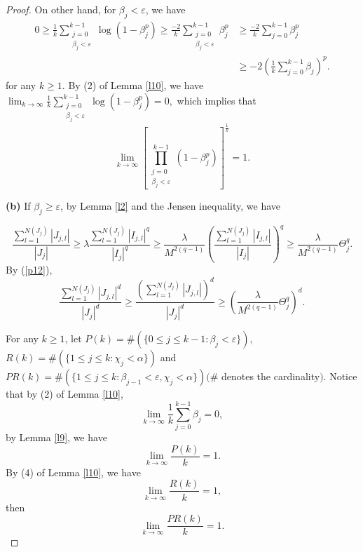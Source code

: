 \documentclass[reqno]{amsart}
\theoremstyle{plain}
\theoremstyle{definition}
\theoremstyle{remark}
\numberwithin{equation}{section} \DeclareMathOperator\intr{int}
\begin{document}
\begin{proof}
On other hand, for $\beta_j<\varepsilon$, we have
\begin{equation*}
\begin{aligned}
0\ge \frac{1}{k} \sum_{\substack{j = 0\\\beta_j<\varepsilon }}^{k-1}\log(1-\beta^p_j)\ge\frac{-2}{k} \sum_{\substack{j = 0\\\beta_j<\varepsilon }}^{k-1}\beta^p_j&\ge\frac{-2}{k}\sum_{j = 0}^{k-1}\beta^p_j\\
 &\ge-2(\frac{1}{k}\sum_{j=0}^{k-1}\beta_j )^p.
\end{aligned}
\end{equation*}
for any $k\ge 1$. By (2) of Lemma \ref{l10}, we have $\lim_{k \to \infty} \frac{1}{k} \sum_{\substack{j = 0\\\beta_j<\varepsilon }}^{k-1}\log(1-\beta^p_j)=0,$ which implies that
\begin{equation}\label{639}
\lim_{k \to \infty} [\prod_{\substack{j = 0\\\beta_j<\varepsilon }}^{k-1}(1-\beta^p_j)]^{\frac{1}{k}}=1.
\end{equation}








\textbf{(b)} If $\beta_j\ge \varepsilon$, by  Lemma \ref{l2}  and the Jensen inequality, we have

\begin{equation*}
\frac{\sum_{l=1}^{N(J_j)}\left | J_{j,l} \right | }{\left | J_j \right |}\ge \lambda\frac{\sum_{l=1}^{N(J_j)}\left | I_{j,l} \right |^q }{\left | I_j \right |^q}\ge \frac{\lambda}{M^{2(q-1)}}(\frac{\sum_{l=1}^{N(J_j)}\left | I_{j,l} \right |}{\left | I_j \right |})^q \ge\frac{\lambda}{M^{2(q-1)}}\Theta^q_j.
\end{equation*}
By (\ref{p12}),
\begin{equation}\label{640}
\frac{\sum_{l=1}^{N(J_j)}\left | J_{j,l} \right |^d }{\left | J_j \right |^d}\ge \frac{(\sum_{l=1}^{N(J_j)}\left | J_{j,l} \right |)^d }{\left | J_j \right |^d}\ge (\frac{\lambda}{M^{2(q-1)}}\Theta^q_j)^d.
\end{equation}

For any $k\ge1$, let $P(k)=\#(\{0\le j \le k-1: \beta_j<\varepsilon\})$, $R(k)=\#(\{1\le j \le k: \chi_j<\alpha\})$ and $PR(k)=\#(\{1\le j \le k: \beta_{j-1}<\varepsilon, \chi_j<\alpha\})$$(\#$ denotes the cardinality$)$.
Notice that by (2) of Lemma \ref{l10},
\begin{equation*}
\lim_{k\to \infty} \frac{1}{k} \sum_{j=0}^{k-1}\beta_j=0,
\end{equation*}
by Lemma \ref{l9}, we have
\begin{equation}\label{pk}
\lim_{k\to \infty} \frac{P(k)}{k}=1.
\end{equation}
By (4) of Lemma \ref{l10}, we have
\begin{equation*}
\lim_{k\to \infty} \frac{R(k)}{k}=1,
\end{equation*}
then
\begin{equation}\label{prk}
\lim_{k\to \infty} \frac{PR(k)}{k}=1.
\end{equation}


\end{proof}
\end{document}
